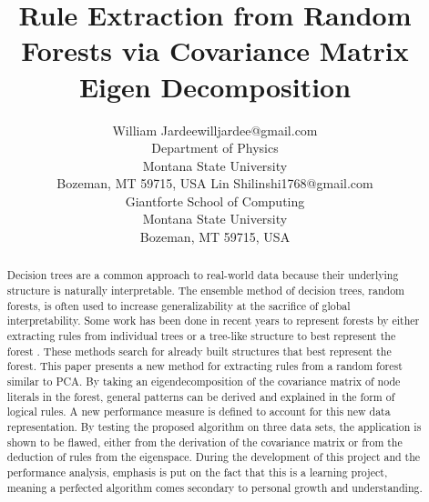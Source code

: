 \documentclass[11pt]{article}
\begin{document}
\title{Rule Extraction from Random Forests via Covariance Matrix Eigen Decomposition}

\author{\name William Jardee\email willjardee@gmail.com \\
       \addr Department of Physics\\
       Montana State University\\
       Bozeman, MT 59715, USA\AND
       \name Lin Shi\email linshi1768@gmail.com\\
       \addr Giantforte School of Computing\\
       Montana State University\\
       Bozeman, MT 59715, USA
       }

\maketitle

\begin{abstract}%
\begin{small}
Decision trees are a common approach to real-world data because their underlying structure is naturally interpretable. The ensemble method of decision trees, random forests, is often used to increase generalizability at the sacrifice of global interpretability. Some work has been done in recent years to represent forests by either extracting rules from individual trees \citep{benard2021interpretable, mashayekhi2015rule} or a tree-like structure to best represent the forest \citep{boruah2022transparent, vidal2020born}. These methods search for already built structures that best represent the forest. This paper presents a new method for extracting rules from a random forest similar to PCA. By taking an eigendecomposition of the covariance matrix of node literals in the forest, general patterns can be derived and explained in the form of logical rules. A new performance measure is defined to account for this new data representation. By testing the proposed algorithm on three data sets, the application is shown to be flawed, either from the derivation of the covariance matrix or from the deduction of rules from the eigenspace. During the development of this project and the performance analysis, emphasis is put on the fact that this is a learning project, meaning a perfected algorithm comes secondary to personal growth and understanding. 
\end{small}
\end{abstract}
 
\end{document}
